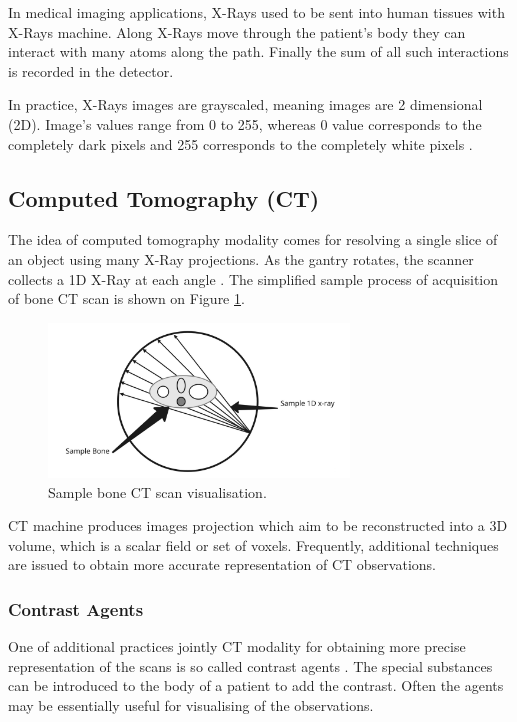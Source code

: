 In medical imaging applications, X-Rays used to be sent into human tissues with X-Rays machine. Along X-Rays move through the patient's body they can interact with many atoms along the path. Finally the sum of all such interactions is recorded in the detector. 

In practice, X-Rays images are grayscaled, meaning images are 2 dimensional (2D). Image's values range from 0 to 255, whereas 0 value corresponds to the completely dark pixels and 255 corresponds to the completely white pixels \cite{Margaritondo2011}.


\subsection{Computed Tomography (CT)}
The idea of computed tomography modality comes for resolving a single slice of an object using many X-Ray projections. As the gantry rotates, the scanner collects a 1D X-Ray at each angle \cite{Guha2020}. The simplified sample process of acquisition of bone CT scan is shown on Figure \ref{fig:ct_sample}. 

\begin{figure}[h]
    \centering \includegraphics[width=8cm]{images/ct-scan-sample.jpeg}
    \caption {Sample bone CT scan visualisation.}
    \label{fig:ct_sample}
\end{figure}

CT machine produces images projection which aim to be reconstructed into a 3D volume, which is a scalar field or set of voxels. Frequently, additional techniques are issued to obtain more accurate representation of CT observations.    

\subsubsection{Contrast Agents}
One of additional practices jointly CT modality for obtaining more precise representation of the scans is so called contrast agents \cite{Lossau2019}. The special substances can be introduced to the body of a patient to add the contrast. Often the agents may be essentially useful for visualising of the observations.          

